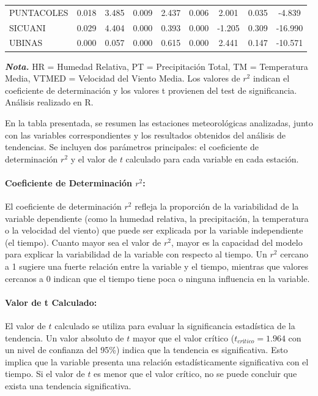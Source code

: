 \begin{landscape}
\begin{table}[ht]
\begin{adjustbox}{valign=c, width=\textwidth}
\begin{tabular}{lcccccccc}
PUNTACOLES    & 0.018 &  3.485 & 0.009 &  2.437 & 0.006 &  2.001 & 0.035 & -4.839 \\
SICUANI       & 0.029 &  4.404 & 0.000 &  0.393 & 0.000 & -1.205 & 0.309 & -16.990 \\
UBINAS        & 0.000 &  0.057 & 0.000 &  0.615 & 0.000 &  2.441 & 0.147 & -10.571 \\
\bottomrule
\end{tabular}
\end{adjustbox}
\end{table}
\vspace{0.2cm}  %
\begin{justify}
\small \textbf{\textit{Nota.}} HR = Humedad Relativa, PT = Precipitación Total, TM = Temperatura Media, VTMED = Velocidad del Viento Media. Los valores de $r^2$ indican el coeficiente de determinación y los valores t provienen del test de significancia. Análisis realizado en R.
\end{justify}

\end{landscape}



En la tabla presentada, se resumen las estaciones meteorológicas analizadas, junto con las variables correspondientes y los resultados obtenidos del análisis de tendencias. Se incluyen dos parámetros principales: el coeficiente de determinación \(r^2\) y el valor de \(t\) calculado para cada variable en cada estación.

\paragraph{Coeficiente de Determinación \(r^2\):} El coeficiente de determinación \(r^2\) refleja la proporción de la variabilidad de la variable dependiente (como la humedad relativa, la precipitación, la temperatura o la velocidad del viento) que puede ser explicada por la variable independiente (el tiempo). Cuanto mayor sea el valor de \(r^2\), mayor es la capacidad del modelo para explicar la variabilidad de la variable con respecto al tiempo. Un \(r^2\) cercano a 1 sugiere una fuerte relación entre la variable y el tiempo, mientras que valores cercanos a 0 indican que el tiempo tiene poca o ninguna influencia en la variable.

\paragraph{Valor de t Calculado:} El valor de \(t\) calculado se utiliza para evaluar la significancia estadística de la tendencia. Un valor absoluto de \(t\) mayor que el valor crítico (\(t_{crítico} = 1.964\) con un nivel de confianza del 95\%) indica que la tendencia es significativa. Esto implica que la variable presenta una relación estadísticamente significativa con el tiempo. Si el valor de \(t\) es menor que el valor crítico, no se puede concluir que exista una tendencia significativa.

